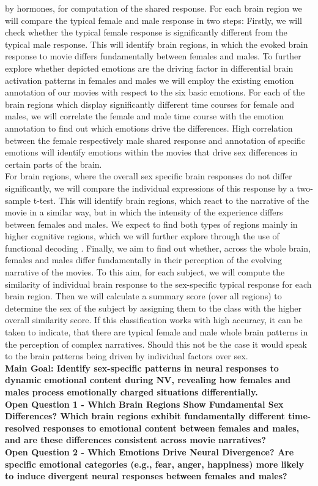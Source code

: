 \documentclass[11pt,a4paper]{article}
\begin{document}
by hormones, for computation of the shared response.
For each brain region we will compare the typical female and male response in two steps: Firstly, we will
check whether the typical female response is significantly different from the typical male response. This
will identify brain regions, in which the evoked brain response to movie differs fundamentally between
females and males. To further explore whether depicted emotions are the driving factor in differential brain
activation patterns in females and males we will employ the existing emotion annotation of our movies with
respect to the six basic emotions. For each of the brain regions which display significantly different time
courses for female and males, we will correlate the female and male time course with the emotion
annotation to find out which emotions drive the differences. High correlation between the female
respectively male shared response and annotation of specific emotions will identify emotions within the
movies that drive sex differences in certain parts of the brain.\\
For brain regions, where the overall sex specific brain responses do not differ significantly, we will compare
the individual expressions of this response by a two-sample t-test. This will identify brain regions, which
react to the narrative of the movie in a similar way, but in which the intensity of the experience differs
between females and males. We expect to find both types of regions mainly in higher cognitive regions,
which we will further explore through the use of functional decoding \parencite{foxMetaanalysisHumanNeuroimaging2014a}.
Finally, we aim to find out whether, across the whole brain, females and males differ fundamentally in their
perception of the evolving narrative of the movies. To this aim, for each subject, we will compute the
similarity of individual brain response to the sex-specific typical response for each brain region. Then we
will calculate a summary score (over all regions) to determine the sex of the subject by assigning them to
the class with the higher overall similarity score. If this classification works with high accuracy, it can be
taken to indicate, that there are typical female and male whole brain patterns in the perception of complex
narratives. Should this not be the case it would speak to the brain patterns being driven by individual factors
over sex.\\
\textbf{Main Goal: Identify sex-specific patterns in neural responses to dynamic emotional content during NV,
revealing how females and males process emotionally charged situations differentially.}\\
\textbf{Open Question 1 - Which Brain Regions Show Fundamental Sex Differences? Which brain regions
exhibit fundamentally different time-resolved responses to emotional content between females and males,
and are these differences consistent across movie narratives?}\\
\textbf{Open Question 2 - Which Emotions Drive Neural Divergence? Are specific emotional categories (e.g.,
fear, anger, happiness) more likely to induce divergent neural responses between females and males?}\\




\printbibliography
\end{document}
